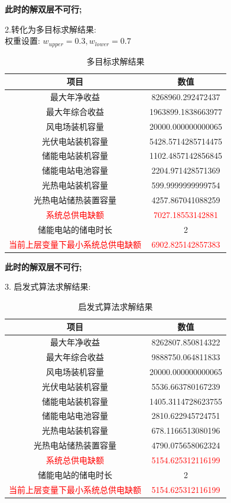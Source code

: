 \documentclass{article}
\begin{document}
\bf{此时的解双层不可行};
    
2.转化为多目标求解结果: \\
权重设置: $w_{upper}=0.3, w_{lower}=0.7$

\begin{table}[H]
    \centering
    \caption{多目标求解结果}
    \label{tab:multi_objective_result}
    \begin{tabular}{c|c}
        \toprule
        \textbf{项目} & \textbf{数值} \\
        \midrule
        最大年净收益 & 8268960.292472437 \\
        最大年综合收益 & 1963899.1838663977 \\
        风电场装机容量 & 20000.000000000065 \\
        光伏电站装机容量 & 5428.5714285714475 \\
        储能电站装机容量 & 1102.4857142856845 \\
        储能电站电池容量 & 2204.971428571369 \\
        光热电站装机容量 & 599.9999999999754 \\
        光热电站储热装置容量 & 4257.867041088259 \\
        \textcolor{red}{系统总供电缺额} & \textcolor{red}{7027.18553142881} \\
        储能电站的储电时长 & 2 \\
        \textcolor{red}{当前上层变量下最小系统总供电缺额} & \textcolor{red}{6902.825142857383} \\
        \bottomrule
    \end{tabular}
\end{table}

\bf{此时的解双层不可行};

3. 启发式算法求解结果:
\begin{table}[H]
    \centering
    \caption{启发式算法求解结果}
    \label{tab:heuristic_result}
    \begin{tabular}{c|c}
        \toprule
        \textbf{项目} & \textbf{数值} \\
        \midrule
        最大年净收益 & 8262807.850814322 \\
        最大年综合收益 & 9888750.064811833 \\
        风电场装机容量 & 20000.000000000065 \\
        光伏电站装机容量 & 5536.663780167239 \\
        储能电站装机容量 & 1405.3114728623755 \\
        储能电站电池容量 & 2810.622945724751 \\
        光热电站装机容量 & 678.1166513080196 \\
        光热电站储热装置容量 & 4790.075658062324 \\
        \textcolor{red}{系统总供电缺额} & \textcolor{red}{5154.625312116199} \\
        储能电站的储电时长 & 2 \\
        \textcolor{red}{当前上层变量下最小系统总供电缺额} & \textcolor{red}{5154.625312116199} \\
        \bottomrule
    \end{tabular}
\end{table}
\end{document}
